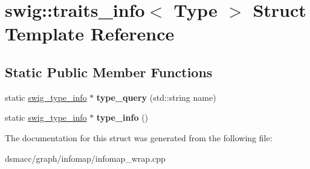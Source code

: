 \hypertarget{structswig_1_1traits__info}{}\section{swig\+:\+:traits\+\_\+info$<$ Type $>$ Struct Template Reference}
\label{structswig_1_1traits__info}
\subsection*{Static Public Member Functions}
\begin{DoxyCompactItemize}
\item 
\mbox{\label{structswig_1_1traits__info_a2616554081419ccfe7f4396f1b8656f9}} 
static \mbox{\hyperlink{structswig__type__info}{swig\+\_\+type\+\_\+info}} $\ast$ {\bfseries type\+\_\+query} (std\+::string name)
\item 
\mbox{\label{structswig_1_1traits__info_acfa11e9ee91b0e0319bf8a3707f71084}} 
static \mbox{\hyperlink{structswig__type__info}{swig\+\_\+type\+\_\+info}} $\ast$ {\bfseries type\+\_\+info} ()
\end{DoxyCompactItemize}


The documentation for this struct was generated from the following file\+:\begin{DoxyCompactItemize}
\item 
dsmacc/graph/infomap/infomap\+\_\+wrap.\+cpp\end{DoxyCompactItemize}

